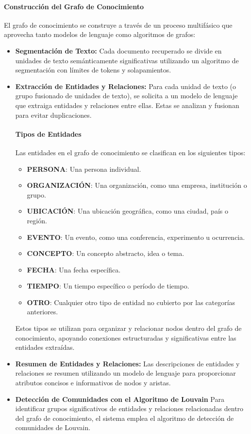\documentclass[12pt]{article}
\begin{document}
\paragraph{Construcción del Grafo de Conocimiento}
El grafo de conocimiento se construye a través de un proceso multifásico que aprovecha tanto modelos de lenguaje como algoritmos de grafos:
\begin{itemize}
    \item \textbf{Segmentación de Texto:} Cada documento recuperado se divide en unidades de texto semánticamente significativas utilizando un algoritmo de segmentación con límites de tokens y solapamientos.
    \item \textbf{Extracción de Entidades y Relaciones:} Para cada unidad de texto (o grupo fusionado de unidades de texto), se solicita a un modelo de lenguaje que extraiga entidades y relaciones entre ellas. Estas se analizan y fusionan para evitar duplicaciones.
    \paragraph{Tipos de Entidades}
Las entidades en el grafo de conocimiento se clasifican en los siguientes tipos:
\begin{itemize}
    \item \textbf{PERSONA}: Una persona individual.
    \item \textbf{ORGANIZACIÓN}: Una organización, como una empresa, institución o grupo.
    \item \textbf{UBICACIÓN}: Una ubicación geográfica, como una ciudad, país o región.
    \item \textbf{EVENTO}: Un evento, como una conferencia, experimento u ocurrencia.
    \item \textbf{CONCEPTO}: Un concepto abstracto, idea o tema.
    \item \textbf{FECHA}: Una fecha específica.
    \item \textbf{TIEMPO}: Un tiempo específico o período de tiempo.
    \item \textbf{OTRO}: Cualquier otro tipo de entidad no cubierto por las categorías anteriores.
\end{itemize}
Estos tipos se utilizan para organizar y relacionar nodos dentro del grafo de conocimiento, apoyando conexiones estructuradas y significativas entre las entidades extraídas.

    \item \textbf{Resumen de Entidades y Relaciones:} Las descripciones de entidades y relaciones se resumen utilizando un modelo de lenguaje para proporcionar atributos concisos e informativos de nodos y aristas.
    \item \textbf{Detección de Comunidades con el Algoritmo de Louvain}
Para identificar grupos significativos de entidades y relaciones relacionadas dentro del grafo de conocimiento, el sistema emplea el algoritmo de detección de comunidades de Louvain.


\end{itemize}
\end{document}
